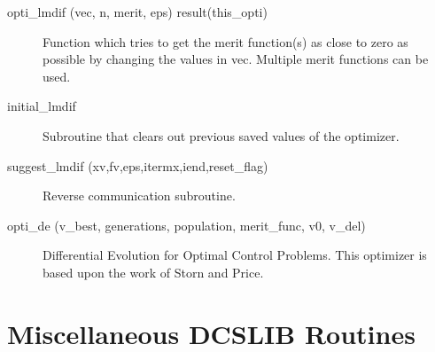 \begin{description}

\item[opti\_lmdif (vec, n, merit, eps) result(this\_opti)] \Newline 
     Function which tries to get the merit function(s) as close to zero as possible
     by changing the values in vec. Multiple merit functions can be used.

\item[initial\_lmdif] \Newline 
     Subroutine that clears out previous saved values of the optimizer.

\item[suggest\_lmdif (xv,fv,eps,itermx,iend,reset\_flag)] \Newline 
     Reverse communication subroutine. 

\item[opti\_de (v\_best, generations, population, merit\_func, v0, v\_del)] \Newline 
     Differential Evolution for Optimal Control Problems.
     This optimizer is based upon the work of Storn and Price. 

\end{description}

\section{Miscellaneous DCSLIB Routines}
\label{r:dcs_misc}      

